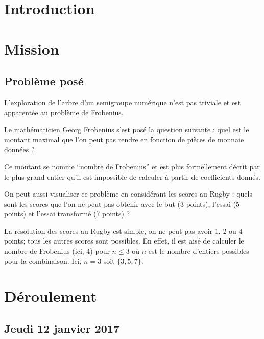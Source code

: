 \documentclass[12pt,a4paper]{article}
\let\leq\leqslant
\begin{document}
\section*{Introduction}

\section{Mission}

\subsection{Problème posé}

L'exploration de l'arbre d'un semigroupe numérique n'est pas triviale et est apparentée au problème de Frobenius.

Le mathématicien Georg Frobenius s'est posé la question suivante : quel est le montant maximal que l'on peut pas rendre en fonction de pièces de monnaie données ?

Ce montant se nomme ``nombre de Frobenius'' et est plus formellement décrit par le plus grand entier qu'il est impossible de calculer à partir de coefficients donnés.

On peut aussi visualiser ce problème en considérant les scores au Rugby : quels sont les scores que l'on ne peut pas obtenir avec le but (3 points), l'essai (5 points) et l'essai transformé (7 points) ?

La résolution des scores au Rugby est simple, on ne peut pas avoir 1, 2 ou 4 points; tous les autres scores sont possibles. En effet, il est aisé de calculer le nombre de Frobenius (ici, 4) pour $n \leq 3$ où $n$ est le nombre d'entiers possibles pour la combinaison. Ici, $n = 3$ soit $\{3,5,7\}$.

\section{Déroulement}

\subsection{Jeudi 12 janvier 2017}
\end{document}
